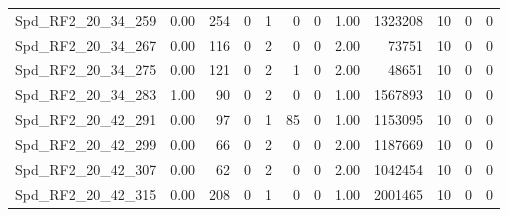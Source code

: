 \begin{longtable}[c]{@{}lrrrrrrrrrrr@{}}
Spd\_RF2\_20\_34\_259        & 0.00                   & 254                     & 0                       & 1                      & 0                       & 0                       & 1.00                    & 1323208                  & 10                       & 0                        & 0                        \\
Spd\_RF2\_20\_34\_267        & 0.00                   & 116                     & 0                       & 2                      & 0                       & 0                       & 2.00                    & 73751                    & 10                       & 0                        & 0                        \\
Spd\_RF2\_20\_34\_275        & 0.00                   & 121                     & 0                       & 2                      & 1                       & 0                       & 2.00                    & 48651                    & 10                       & 0                        & 0                        \\
Spd\_RF2\_20\_34\_283        & 1.00                   & 90                      & 0                       & 2                      & 0                       & 0                       & 1.00                    & 1567893                  & 10                       & 0                        & 0                        \\
Spd\_RF2\_20\_42\_291        & 0.00                   & 97                      & 0                       & 1                      & 85                      & 0                       & 1.00                    & 1153095                  & 10                       & 0                        & 0                        \\
Spd\_RF2\_20\_42\_299        & 0.00                   & 66                      & 0                       & 2                      & 0                       & 0                       & 2.00                    & 1187669                  & 10                       & 0                        & 0                        \\
Spd\_RF2\_20\_42\_307        & 0.00                   & 62                      & 0                       & 2                      & 0                       & 0                       & 2.00                    & 1042454                  & 10                       & 0                        & 0                        \\
Spd\_RF2\_20\_42\_315        & 0.00                   & 208                     & 0                       & 1                      & 0                       & 0                       & 1.00                    & 2001465                  & 10                       & 0                        & 0                        \\

\end{longtable}
